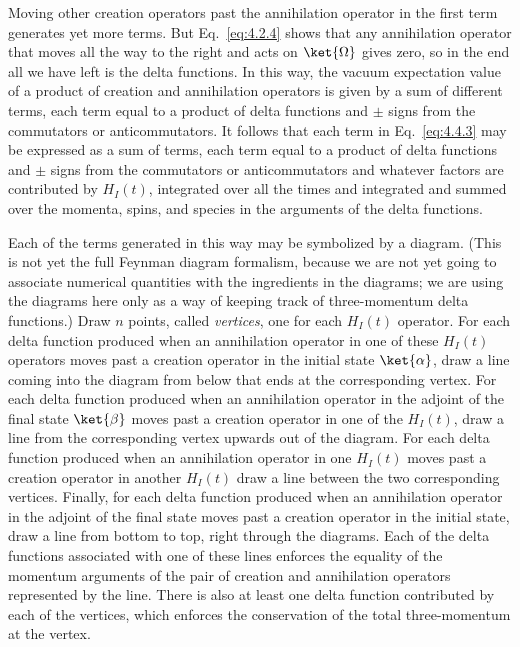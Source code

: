 Moving other creation operators past the annihilation operator in the first
term generates yet more terms. But Eq.~\eqref{eq:4.2.4} shows that any annihilation
operator that moves all the way to the right and acts on $\ket{\Omega}$ gives
zero, so in the end all we have left is the delta functions. In this way, the
vacuum expectation value of a product of creation and annihilation operators is
given by a sum of different terms, each term equal to a product of delta
functions and $\pm$ signs from the commutators or anticommutators. It follows
that each term in Eq.~\eqref{eq:4.4.3} may be expressed as a sum of terms, each term
equal to a product of delta functions and $\pm$ signs from the commutators or
anticommutators and whatever factors are contributed by $H_I(t)$, integrated
over all the times and integrated and summed over the momenta, spins, and
species in the arguments of the delta functions.

Each of the terms generated in this way may be symbolized by a diagram. (This
is not yet the full Feynman diagram formalism, because we are not yet going to
associate numerical quantities with the ingredients in the diagrams; we are
using the diagrams here only as a way of keeping track of three-momentum delta
functions.) Draw $n$ points, called \emph{vertices}, one for each $H_I(t)$
operator. For each delta function produced when an annihilation operator in one
of these $H_I(t)$ operators moves past a creation operator in the initial state
$\ket{\alpha}$, draw a line coming into the diagram from below that ends at the
corresponding vertex. For each delta function produced when an annihilation
operator in the adjoint of the final state $\ket{\beta}$ moves past a creation
operator in one of the $H_I(t)$, draw a line from the corresponding vertex
upwards out of the diagram. For each delta function produced when an
annihilation operator in one $H_I(t)$ moves past a creation operator in another
$H_I(t)$ draw a line between the two corresponding vertices. Finally, for each
delta function produced when an annihilation operator in the adjoint of the
final state moves past a creation operator in the initial state, draw a line
from bottom to top, right through the diagrams. Each of the delta functions
associated with one of these lines enforces the equality of the momentum
arguments of the pair of creation and annihilation operators represented by the
line. There is also at least one delta function contributed by each of the
vertices, which enforces the conservation of the total three-momentum at the
vertex.


